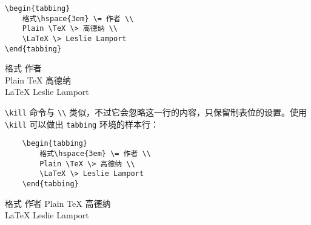 \begin{minipage}[t]{0.45\textwidth}
\begin{lstlisting}
\begin{tabbing}
    格式\hspace{3em} \= 作者 \\
    Plain \TeX \> 高德纳 \\ 
    \LaTeX \> Leslie Lamport
\end{tabbing}
\end{lstlisting}
\end{minipage}
\hfill
\begin{minipage}[t]{0.45\textwidth}
    \begin{tabbing}
        格式\hspace{3em} \= 作者 \\
        Plain \TeX \> 高德纳 \\ 
        \LaTeX \> Leslie Lamport
    \end{tabbing}
\end{minipage}

\verb|\kill| 命令与 \verb|\\| 类似，不过它会忽略这一行的内容，只保留制表位的设置。使用 \verb|\kill| 可以做出 \verb|tabbing| 环境的样本行：

\begin{minipage}[t]{0.45\textwidth}
    \begin{lstlisting}
    \begin{tabbing}
        格式\hspace{3em} \= 作者 \\
        Plain \TeX \> 高德纳 \\ 
        \LaTeX \> Leslie Lamport
    \end{tabbing}
    \end{lstlisting}
    \end{minipage}
    \hfill
    \begin{minipage}[t]{0.45\textwidth}
        \begin{tabbing}
            格式\hspace{3em} \= 作者 \kill
            Plain \TeX \> 高德纳 \\ 
            \LaTeX \> Leslie Lamport
        \end{tabbing}
    \end{minipage}

